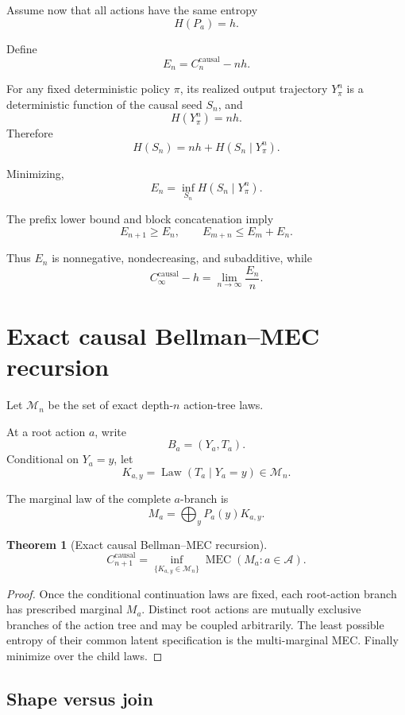 \documentclass[11pt,a4paper]{article}
\newtheorem{theorem}{Theorem}[section]
\newcommand{\Law}{\operatorname{Law}}
\newcommand{\MEC}{\operatorname{MEC}}
\newcommand{\Ccausal}{C^{\mathrm{causal}}}
\newcommand{\CinfCausal}{C_{\infty}^{\mathrm{causal}}}
\newcommand{\cA}{\mathcal A}
\newcommand{\cM}{\mathcal M}
\newcommand{\1}{\mathbf 1}
\begin{document}
Assume now that all actions have the same entropy
\[
H(P_a)=h.
\]

Define
\[
E_n
=
\Ccausal_n-nh.
\tag{12.9}
\]

For any fixed deterministic policy \(\pi\), its realized output
trajectory \(Y_\pi^n\) is a deterministic function of the causal seed
\(S_n\), and
\[
H(Y_\pi^n)=nh.
\]
Therefore
\[
\boxed{
H(S_n)
=
nh+H(S_n\mid Y_\pi^n).
}
\tag{12.10}
\]

Minimizing,
\[
\boxed{
E_n
=
\inf_{S_n}
H(S_n\mid Y_\pi^n).
}
\tag{12.11}
\]

The prefix lower bound and block concatenation imply
\[
E_{n+1}\ge E_n,
\qquad
E_{m+n}\le E_m+E_n.
\tag{12.12}
\]

Thus \(E_n\) is nonnegative, nondecreasing, and subadditive, while
\[
\boxed{
\CinfCausal-h
=
\lim_{n\to\infty}\frac{E_n}{n}.
}
\tag{12.13}
\]


\section{Exact causal Bellman--MEC recursion}

Let \(\cM_n\) be the set of exact depth-\(n\) action-tree laws.

At a root action \(a\), write
\[
B_a=(Y_a,T_a).
\]
Conditional on \(Y_a=y\), let
\[
K_{a,y}
=
\Law(T_a\mid Y_a=y)
\in\cM_n.
\]

The marginal law of the complete \(a\)-branch is
\[
M_a
=
\bigoplus_yP_a(y)K_{a,y}.
\tag{13.1}
\]

\begin{theorem}[Exact causal Bellman--MEC recursion]
\[
\boxed{
\Ccausal_{n+1}
=
\inf_{\{K_{a,y}\in\cM_n\}}
\MEC(M_a:a\in\cA).
}
\tag{13.2}
\]
\end{theorem}

\begin{proof}
Once the conditional continuation laws are fixed, each root-action
branch has prescribed marginal \(M_a\).
Distinct root actions are mutually exclusive branches of the action
tree and may be coupled arbitrarily.
The least possible entropy of their common latent specification is the
multi-marginal MEC.
Finally minimize over the child laws.
\end{proof}


\subsection{Shape versus join}
\end{document}
